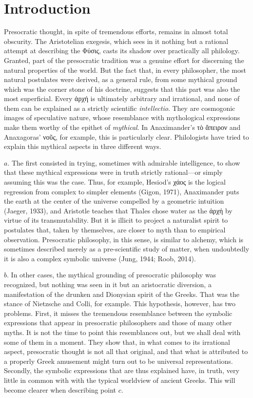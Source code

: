 \documentclass[a4paper]{article}
\begin{document}
\section{Introduction}

Presocratic thought, in spite of tremendous efforts, 
remains in almost total obscurity. The Aristotelian exegesis, which sees in it
nothing but a rational attempt at describing the Φύσις, casts its shadow over
practically all philology. Granted, part of the presocratic tradition was a
genuine effort for discerning the natural properties of the world. But the fact
that, in every philosopher, the most natural postulates were derived, as a
general rule, from some mythical ground which was the corner stone of his
doctrine, suggests that this part was also the most superficial. Every ἀρχή is
ultimately arbitrary and irrational, and none of them can be explained as a
strictly scientific \textit{intellectio}. They are cosmogonic images of
speculative nature, whose resemblance with mythological expressions make them
worthy of the epithet of \textit{mythical}. In Anaximander's τὸ ἄπειρον and
Anaxagoras' νοῦς, for example, this is particularly clear. Philologists have
tried to explain this mythical aspects in three different ways.

$ a. $ The first consisted in trying, sometimes with admirable intelligence, to
show that these mythical expressions were in truth strictly rational---or simply
assuming this was the case. Thus, for example, Hesiod's χάος is the logical
regression from complex to simpler elements (Gigon, 1971), Anaximander puts the
earth at the center of the universe compelled by a geometric intuition (Jaeger,
1933), and Aristotle teaches that Thales chose water as the ἀρχή by virtue of
its transmutability. But it is illicit to project a naturalist spirit to
postulates that, taken by themselves, are closer to myth than to empirical
observation. Presocratic philosophy, in this sense, is similar to alchemy,
which is sometimes described merely as a pre-scientific study of
matter, when undoubtedly it is also a complex symbolic universe (Jung, 1944; Roob,
2014).

$ b. $ In other cases, the mythical grounding of presocratic philosophy was
recognized, but nothing was seen in it but an aristocratic diversion, a
manifestation of the drunken and Dionysian spirit of the Greeks. That was the
stance of Nietzsche and Colli, for example. This hypothesis, however, has two
problems. First, it misses the tremendous resemblance between the symbolic
expressions that appear in presocratic philosophers and those of many other
myths. It is not the time to point this resemblances out, but we shall deal with
some of them in a moment. They show that, in what comes to its irrational
aspect, presocratic thought is not all that original, and that what is
attributed to a properly Greek amusement might turn out to be universal
representations. Secondly, the symbolic expressions that are thus explained
have, in truth, very little in common with with the typical worldview of ancient
Greeks. This will become clearer when describing point $ c. $ 
\end{document}
